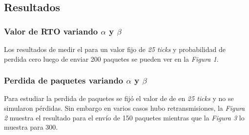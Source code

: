 \subsection{Resultados}

    \subsubsection{Valor de RTO variando $\alpha$ y $\beta$}
        Los resultados de medir el \rto{} para un valor fijo de 
        \textit{25 ticks} y probabilidad de perdida cero luego de 
        enviar 200 paquetes se pueden ver en la \emph{Figura 1}.
        
    \subsubsection{Perdida de paquetes variando $\alpha$ y $\beta$}
        Para estudiar la perdida de paquetes se fij\'o el valor de 
        de \rto{} en \textit{25 ticks} y no se simularon p\'erdidas.
        Sin embargo en varios casos hubo retransmisiones, la 
        \textit{Figura 2} muestra el resultado para el env\'io de 150
        paquetes mientras que la \textit{Figura 3} lo muestra para 300.
        
